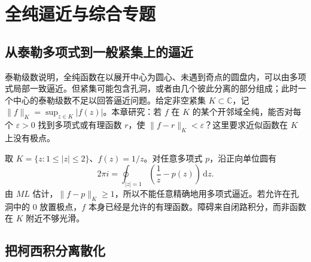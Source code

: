 \setcounter{chapter}{15} %
\chapter{全纯逼近与综合专题}
\label{chap:ca-approximation}

\section{从泰勒多项式到一般紧集上的逼近}

泰勒级数说明，全纯函数在以展开中心为圆心、未遇到奇点的圆盘内，可以由多项式局部一致逼近。但紧集可能包含孔洞，或者由几个彼此分离的部分组成；此时一个中心的泰勒级数不足以回答逼近问题。给定非空紧集 $K\subset\mathbb C$，记 $\|f\|_K=\sup_{z\in K}|f(z)|$。本章研究：若 $f$ 在 $K$ 的某个开邻域全纯，能否对每个 $\varepsilon>0$ 找到多项式或有理函数 $r$，使 $\|f-r\|_K<\varepsilon$？这里要求近似函数在 $K$ 上没有极点。

\begin{example}[孔洞造成的多项式逼近障碍]
取 $K=\{z:1\le |z|\le2\}$、$f(z)=1/z$。对任意多项式 $p$，沿正向单位圆有
\[
 2\pi i=\oint_{|z|=1}\left(\frac1z-p(z)\right)\,\mathrm dz.
\]
由 $ML$ 估计，$\|f-p\|_K\ge1$，所以不能任意精确地用多项式逼近。若允许在孔洞中的 $0$ 放置极点，$f$ 本身已经是允许的有理函数。障碍来自闭路积分，而非函数在 $K$ 附近不够光滑。
\end{example}

\section{把柯西积分离散化}

